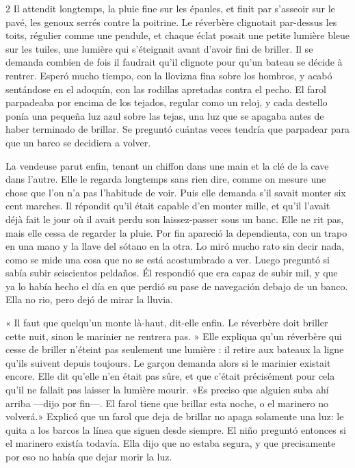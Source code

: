 \begin{paracol}{2}
\pair
  {Il attendit longtemps, la pluie fine sur les épaules, et finit par
   s'asseoir sur le pavé, les genoux serrés contre la poitrine. Le réverbère
   clignotait par-dessus les toits, régulier comme une pendule, et chaque
   éclat posait une petite lumière bleue sur les tuiles, une lumière qui
   s'éteignait avant d'avoir fini de briller. Il se demanda combien de fois
   il faudrait qu'il clignote pour qu'un bateau se décide à rentrer.}
  {Esperó mucho tiempo, con la llovizna fina sobre los hombros, y acabó
   sentándose en el adoquín, con las rodillas apretadas contra el pecho. El
   farol parpadeaba por encima de los tejados, regular como un reloj, y cada
   destello ponía una pequeña luz azul sobre las tejas, una luz que se
   apagaba antes de haber terminado de brillar. Se preguntó cuántas veces
   tendría que parpadear para que un barco se decidiera a volver.}

\pair
  {La vendeuse parut enfin, tenant un chiffon dans une main et la clé de la
   cave dans l'autre. Elle le regarda longtemps sans rien dire, comme on mesure
   une chose que l'on n'a pas l'habitude de voir. Puis elle demanda s'il
   savait monter six cent marches. Il répondit qu'il était capable d'en monter
   mille, et qu'il l'avait déjà fait le jour où il avait perdu son
   laissez-passer sous un banc. Elle ne rit pas, mais elle cessa de regarder
   la pluie.}
  {Por fin apareció la dependienta, con un trapo en una mano y la llave del
   sótano en la otra. Lo miró mucho rato sin decir nada, como se mide una cosa
   que no se está acostumbrado a ver. Luego preguntó si sabía subir seiscientos
   peldaños. Él respondió que era capaz de subir mil, y que ya lo había hecho
   el día en que perdió su pase de navegación debajo de un banco. Ella no
   rio, pero dejó de mirar la lluvia.}

\pair
  {« Il faut que quelqu'un monte là-haut, dit-elle enfin. Le réverbère doit
   briller cette nuit, sinon le marinier ne rentrera pas. » Elle expliqua
   qu'un réverbère qui cesse de briller n'éteint pas seulement une lumière :
   il retire aux bateaux la ligne qu'ils suivent depuis toujours. Le garçon
   demanda alors si le marinier existait encore. Elle dit qu'elle n'en était
   pas sûre, et que c'était précisément pour cela qu'il ne fallait pas laisser
   la lumière mourir.}
  {«Es preciso que alguien suba ahí arriba —dijo por fin—. El farol tiene que
   brillar esta noche, o el marinero no volverá.» Explicó que un farol que
   deja de brillar no apaga solamente una luz: le quita a los barcos la línea
   que siguen desde siempre. El niño preguntó entonces si el marinero existía
   todavía. Ella dijo que no estaba segura, y que precisamente por eso no
   había que dejar morir la luz.}


\end{paracol}
